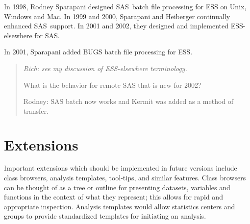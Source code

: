 \documentclass{article}
\newcommand*{\SAS}{\textsc{SAS}}
\newenvironment{Comment}{\begin{quote}\small\itshape }{\end{quote}}
\begin{document}
In 1998, Rodney Sparapani designed \SAS\ batch file processing for ESS
on Unix, Windows and Mac.  In 1999 and 2000, Sparapani and Heiberger
continually enhanced \SAS\ support. 
In 2001 and 2002, they designed and implemented ESS-elsewhere for \SAS.  

In 2001, Sparapani added BUGS batch file processing for ESS.

\begin{Comment}
Rich: see my discussion of ESS-elsewhere terminology.

What is the behavior for remote SAS that is new for 2002?

Rodney: SAS batch now works and Kermit was added as a method of transfer.
\end{Comment}


\section{Extensions}
\label{sec:extensions}


Important extensions which should be implemented in future
versions include class browsers, analysis templates, tool-tips, and
similar features.  Class browsers can be thought of as a tree or
outline for presenting datasets, variables and functions in the
context of what they represent; this allows for rapid and appropriate
inspection.  Analysis templates would allow statistics centers and
groups to provide standardized templates for initiating an analysis.
\end{document}
